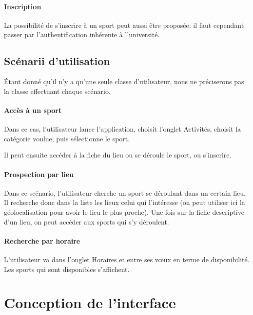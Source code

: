 \documentclass{article}
\begin{document}
        \paragraph{Inscription}

            La possibilité de s'inscrire à un sport peut aussi être proposée: il
            faut cependant passer par l'authentification inhérente à
            l'université.


    \subsection{Scénarii d'utilisation}

    Étant donné qu'il n'y a qu'une seule classe d'utilisateur, nous ne
    préciserons pas la classe effectuant chaque scénario.

        \paragraph{Accès à un sport}

            Dans ce cas, l'utilisateur lance l'application, choisit l'onglet
            Activités, choisit la catégorie voulue, puis sélectionne le sport.

            Il peut ensuite accéder à la fiche du lieu ou se déroule le sport, ou s'inscrire.

        \paragraph{Prospection par lieu}

            Dans ce scénario, l'utilisateur cherche un sport se déroulant dans un
            certain lieu. Il recherche donc dans la liste les lieux celui qui
            l'intéresse (on peut utiliser ici la géolocalisation pour avoir le
            lieu le plus proche). Une fois sur la fiche descriptive d'un lieu,
            on peut accéder aux sports qui s'y déroulent.

        \paragraph{Recherche par horaire}

            L'utilisateur va dans l'onglet \og Horaires\fg{} et entre ses vœux
            en terme de disponibilité. Les sports qui sont disponibles s'affichent.

\section{Conception de l'interface}
\end{document}
